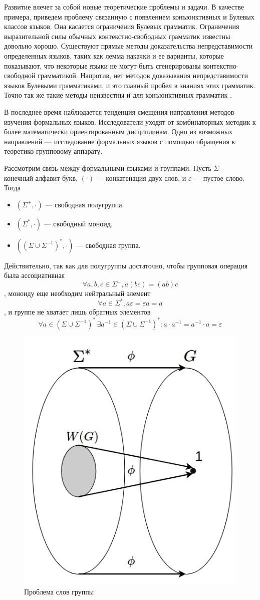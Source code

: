 \documentclass[14pt]{matmex-diploma-custom}
\begin{document}
Развитие влечет за собой новые теоретические проблемы и задачи. 
В качестве примера, приведем проблему связанную с появлением конъюнктивных \cite{ConjGrammars} и Булевых \cite{BoolGrammars} классов языков.
Она касается
ограничения Булевых грамматик. Ограничения выразительной силы обычных контекстно-свободных грамматик
известны довольно хорошо. Существуют прямые методы доказательства непредставимости
определенных языков, таких как лемма накачки и ее
варианты, которые показывают, что некоторые языки не могут быть сгенерированы
 контекстно-свободной грамматикой. Напротив, нет методов доказывания
непредставимости языков Булевыми грамматиками, и это главный пробел в
знаниях этих грамматик. Точно так же такие методы неизвестны
и для конъюнктивных грамматик \cite{OKHOTIN201327}.

В последнее время наблюдается тенденция смещения направления методов изучения формальных языков. 
Исследователи уходят от комбинаторных методик к более математически ориентированным дисциплинам.
Одно из возможных направлений --- исследование формальных языков с помощью обращения 
к теоретико-групповому аппарату.

Рассмотрим связь между формальными языками и группами. 
Пусть $\Sigma$ --- конечный алфавит букв, $(\cdot)$ --- конкатенация двух слов, 
и $\varepsilon$ --- пустое слово.
Тогда 
\begin{itemize}
    \item $(\Sigma^+, \cdot)$ --- свободная полугруппа.
    \item $(\Sigma^*, \cdot)$ --- свободный моноид.
    \item $((\Sigma \cup \Sigma^{-1})^*, \cdot)$ --- свободная группа.
\end{itemize}
 
 Действительно, так как для 
полугруппы достаточно, чтобы групповая операция была ассоциативная
$$\forall a, b, c \in \Sigma^+, a(bc)=(ab)c$$
, моноиду еще необходим нейтральный элемент 
$$\forall a \in \Sigma^*, a\varepsilon=\varepsilon a = a$$
, и группе не хватает лишь обратных элементов
$$\forall a \in (\Sigma \cup \Sigma^{-1})^* \, 
\exists a^{-1} \in (\Sigma \cup \Sigma^{-1})^* : a \cdot a^{-1} = a^{-1} \cdot a = \varepsilon$$

\begin{figure}[H]
\centering
  \includegraphics[width=0.5\linewidth]{pics/3.png}
  \caption{Проблема слов группы}
  \label{fig:word_problem}
\end{figure}
\end{document}
